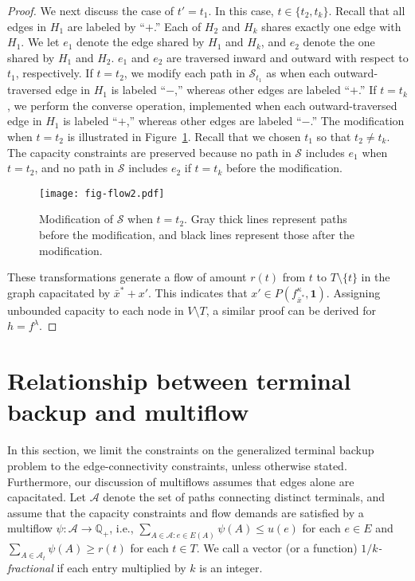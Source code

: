 \documentclass{article}
\newcommand{\Afam}{\mathcal{A}}
\newcommand{\Sfam}{\mathcal{S}}
\newcommand{\Rset}{\mathbb{Q}}
\newcommand{\allone}{\mathbf{1}}
\newcommand{\cut}{P}
\newcommand{\f}{f^{\kappa}}
\newcommand{\g}{f^{\lambda}}
\begin{document}
\begin{proof}
 We next discuss the case of $t'=t_1$.
 In this case, $t \in \{t_2,t_{k}\}$.
Recall that all edges in $H_1$ are labeled by ``$+$.''
Each of $H_2$ and $H_k$ shares exactly one edge with $H_1$. We let $e_1$
 denote the edge shared by $H_1$ and $H_k$, and $e_2$ denote the one
 shared by $H_1$ and $H_2$.
$e_1$ and $e_2$ are traversed inward and outward with respect to $t_1$, respectively.
If $t=t_2$, we modify each path in $\Sfam_{t_1}$
as when each outward-traversed edge in $H_1$ is labeled ``$-$,'' whereas other edges are
labeled ``$+$.''
If $t=t_k$, we perform the converse operation, implemented when
each outward-traversed edge in $H_1$ is labeled ``$+$,'' whereas other edges are labeled ``$-$.''
 The modification when $t=t_2$ is illustrated in Figure~\ref{fig.flow2}.
 Recall that we chosen $t_1$ so that $t_2 \neq t_k$.
The capacity constraints are preserved because
no path in $\Sfam$ includes $e_1$ when $t=t_2$, and 
no path in $\Sfam$ includes $e_2$ if $t=t_k$
before the modification.

\begin{figure}\centering
\texttt{[image: fig-flow2.pdf]}
\caption{Modification of $\Sfam$ when $t=t_2$. Gray thick lines represent paths before the modification,
and black lines represent those after the modification.}\label{fig.flow2}
\end{figure}


These transformations generate a flow of amount $r(t)$ from $t$ to $T\setminus \{t\}$
in the graph capacitated by $\bar{x}^* + x'$.
This indicates that $x' \in \cut(\f_{\bar{x}^*},\allone)$.  
Assigning unbounded capacity to each node in $V\setminus T$,
a similar proof can be derived for $h=\g$.
\end{proof}




\section{Relationship between terminal backup and multiflow}
\label{sec:half_integralty_of_minimum_cost_multiflow}

In this section, we limit the constraints on the generalized terminal backup problem
to the edge-connectivity constraints, unless otherwise stated.
Furthermore, our discussion of multiflows assumes
that edges alone are capacitated.
Let $\Afam$ denote the set of paths connecting distinct terminals,
and assume that the capacity constraints and flow demands are satisfied by 
a multiflow $\psi \colon \Afam \rightarrow \Rset_+$,
i.e., $\sum_{A \in \Afam \colon e \in E(A)} \psi(A) \leq u(e)$ for each $e \in E$
and $\sum_{A \in \Afam_t} \psi(A) \geq r(t)$ for each $t \in T$.
We call a vector (or a function) 
\emph{$1/k$-fractional} if each entry multiplied by $k$ is an integer.
\end{document}
